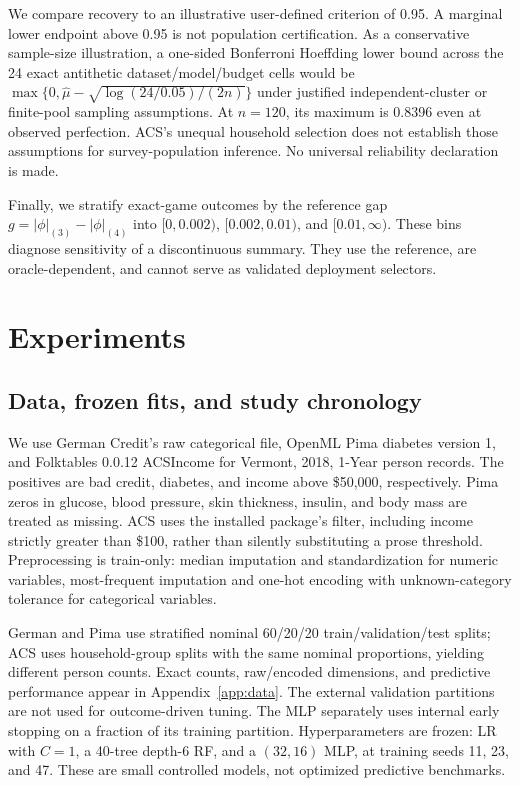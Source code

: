 \documentclass{article}
\begin{document}
We compare recovery to an illustrative user-defined criterion of 0.95. A marginal lower endpoint above 0.95 is not population certification. As a conservative sample-size illustration, a one-sided Bonferroni Hoeffding lower bound across the 24 exact antithetic dataset/model/budget cells would be $\max\{0,\widehat\mu-\sqrt{\log(24/0.05)/(2n)}\}$ under justified independent-cluster or finite-pool sampling assumptions. At $n=120$, its maximum is 0.8396 even at observed perfection. ACS's unequal household selection does not establish those assumptions for survey-population inference. No universal reliability declaration is made.

Finally, we stratify exact-game outcomes by the reference gap $g=|\phi|_{(3)}-|\phi|_{(4)}$ into $[0,0.002)$, $[0.002,0.01)$, and $[0.01,\infty)$. These bins diagnose sensitivity of a discontinuous summary. They use the reference, are oracle-dependent, and cannot serve as validated deployment selectors.

\section{Experiments}
\label{sec:experiments}
\subsection{Data, frozen fits, and study chronology}
We use German Credit's raw categorical file, OpenML Pima diabetes version 1, and Folktables 0.0.12 ACSIncome for Vermont, 2018, 1-Year person records. The positives are bad credit, diabetes, and income above \$50,000, respectively. Pima zeros in glucose, blood pressure, skin thickness, insulin, and body mass are treated as missing. ACS uses the installed package's filter, including income strictly greater than \$100, rather than silently substituting a prose threshold. Preprocessing is train-only: median imputation and standardization for numeric variables, most-frequent imputation and one-hot encoding with unknown-category tolerance for categorical variables.

German and Pima use stratified nominal 60/20/20 train/validation/test splits; ACS uses household-group splits with the same nominal proportions, yielding different person counts. Exact counts, raw/encoded dimensions, and predictive performance appear in Appendix~\ref{app:data}. The external validation partitions are not used for outcome-driven tuning. The MLP separately uses internal early stopping on a fraction of its training partition. Hyperparameters are frozen: LR with $C=1$, a 40-tree depth-6 RF, and a $(32,16)$ MLP, at training seeds 11, 23, and 47. These are small controlled models, not optimized predictive benchmarks.
\end{document}
